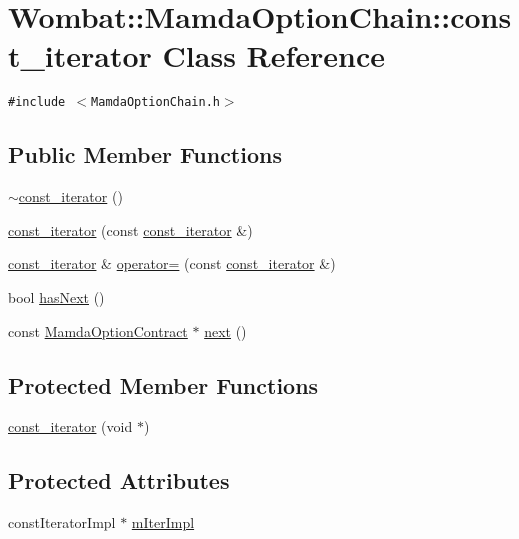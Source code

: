 \hypertarget{classWombat_1_1MamdaOptionChain_1_1const__iterator}{
\section{Wombat::Mamda\-Option\-Chain::const\_\-iterator Class Reference}
\label{classWombat_1_1MamdaOptionChain_1_1const__iterator}
}
{\tt \#include $<$Mamda\-Option\-Chain.h$>$}

\subsection*{Public Member Functions}
\begin{CompactItemize}
\item 
\hyperlink{classWombat_1_1MamdaOptionChain_1_1const__iterator_3103e1e7883cd6b836ba0633f6772a3d}{$\sim$const\_\-iterator} ()
\item 
\hyperlink{classWombat_1_1MamdaOptionChain_1_1const__iterator_b86c8020728415ca63ceaff3aa66fd6c}{const\_\-iterator} (const \hyperlink{classWombat_1_1MamdaOptionChain_1_1const__iterator}{const\_\-iterator} \&)
\item 
\hyperlink{classWombat_1_1MamdaOptionChain_1_1const__iterator}{const\_\-iterator} \& \hyperlink{classWombat_1_1MamdaOptionChain_1_1const__iterator_436bb182281c55b30c57ddb2766e2b78}{operator=} (const \hyperlink{classWombat_1_1MamdaOptionChain_1_1const__iterator}{const\_\-iterator} \&)
\item 
bool \hyperlink{classWombat_1_1MamdaOptionChain_1_1const__iterator_bbd8e3de3f6831bbb2cb0d134a58a603}{has\-Next} ()
\item 
const \hyperlink{classWombat_1_1MamdaOptionContract}{Mamda\-Option\-Contract} $\ast$ \hyperlink{classWombat_1_1MamdaOptionChain_1_1const__iterator_02f105b3a879e872fc5542923abe6f7a}{next} ()
\end{CompactItemize}
\subsection*{Protected Member Functions}
\begin{CompactItemize}
\item 
\hyperlink{classWombat_1_1MamdaOptionChain_1_1const__iterator_c3433f2d11744b9ff17186e2aa7d0bb2}{const\_\-iterator} (void $\ast$)
\end{CompactItemize}
\subsection*{Protected Attributes}
\begin{CompactItemize}
\item 
const\-Iterator\-Impl $\ast$ \hyperlink{classWombat_1_1MamdaOptionChain_1_1const__iterator_6fc0ae3174bf31e265d256579103fe36}{m\-Iter\-Impl}
\end{CompactItemize}
